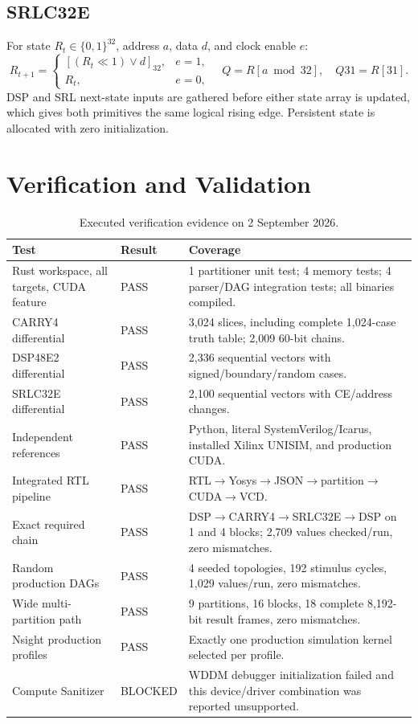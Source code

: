 \documentclass[11pt,a4paper]{article}
\begin{document}
\subsection{SRLC32E}

For state $R_t\in\{0,1\}^{32}$, address $a$, data $d$, and clock enable $e$:
\[
 R_{t+1}=\begin{cases}[ (R_t\ll1)\lor d]_{32},&e=1,\\R_t,&e=0,\end{cases}
\quad Q=R[a\bmod32],\quad Q31=R[31].
\]
DSP and SRL next-state inputs are gathered before either state array is updated,
which gives both primitives the same logical rising edge.  Persistent state is
allocated with zero initialization.

\section{Verification and Validation}

\begin{table}[H]
\centering
\caption{Executed verification evidence on 2 September 2026.}
\small
\begin{tabularx}{\textwidth}{P{40mm} C{22mm} Y}
\toprule
Test & Result & Coverage \\
\midrule
Rust workspace, all targets, CUDA feature & PASS & 1 partitioner unit test; 4 memory tests; 4 parser/DAG integration tests; all binaries compiled. \\
CARRY4 differential & PASS & 3,024 slices, including complete 1,024-case truth table; 2,009 60-bit chains. \\
DSP48E2 differential & PASS & 2,336 sequential vectors with signed/boundary/random cases. \\
SRLC32E differential & PASS & 2,100 sequential vectors with CE/address changes. \\
Independent references & PASS & Python, literal SystemVerilog/Icarus, installed Xilinx UNISIM, and production CUDA. \\
Integrated RTL pipeline & PASS & RTL$\rightarrow$Yosys$\rightarrow$JSON$\rightarrow$partition$\rightarrow$CUDA$\rightarrow$VCD. \\
Exact required chain & PASS & DSP$\rightarrow$CARRY4$\rightarrow$SRLC32E$\rightarrow$DSP on 1 and 4 blocks; 2,709 values checked/run, zero mismatches. \\
Random production DAGs & PASS & 4 seeded topologies, 192 stimulus cycles, 1,029 values/run, zero mismatches. \\
Wide multi-partition path & PASS & 9 partitions, 16 blocks, 18 complete 8,192-bit result frames, zero mismatches. \\
Nsight production profiles & PASS & Exactly one production simulation kernel selected per profile. \\
Compute Sanitizer & BLOCKED & WDDM debugger initialization failed and this device/driver combination was reported unsupported. \\
\bottomrule
\end{tabularx}
\end{table}
\end{document}

